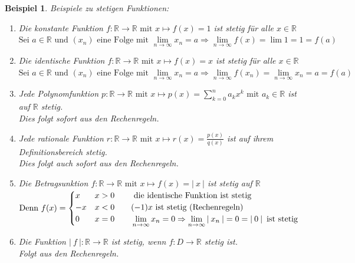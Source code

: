 \documentclass[a4paper,titlepage,oneside]{article}
\def\R{\ensuremath{\mathbb{R}} }
\renewcommand{\liminf}[2][n]{\ensuremath{\lim\limits_{#1 \rightarrow \infty}{#2}}}
\newcommand{\abs}[1]{\ensuremath{\left|\:#1\:\right|}}
\theoremstyle{thmstyle}
\newtheorem{bsp}[satz]{Beispiel}
\theoremstyle{subthmstyle}
\begin{document}
\begin{bsp}
Beispiele zu stetigen Funktionen:
\begin{enumerate}
\item Die konstante Funktion $ f : \R \to \R \text{ mit } x \mapsto f(x) = 1 $ ist stetig für alle $x \in \R$\\
$\displaystyle\text{Sei } a \in \R \text{ und } (x_n) \text{ eine Folge mit } \liminf{x_n} = a \Rightarrow \liminf{f(x)} = \lim 1 = 1 = f(a)$

\item Die identische Funktion $f : \R \to \R \text{ mit } x \mapsto f(x) = x $  ist stetig für alle $x \in \R$\\
$\displaystyle\text{Sei } a \in \R \text { und } (x_n) \text{ eine Folge mit } \liminf{x_n} = a \Rightarrow \liminf{f(x_n)} = \liminf{x_n} = a = f(a)$

\item Jede Polynomfunktion $\displaystyle p : \R \to \R \text{ mit } x \mapsto p(x) = \sum_{k=0}^{n}{a_kx^k} \text{ mit } a_k \in \R $ ist auf \R stetig. \\
Dies folgt sofort aus den Rechenregeln.

\item Jede rationale Funktion  $\displaystyle r : \R \to \R \text{ mit } x \mapsto r(x) = \frac{p(x)}{q(x)} $ ist auf ihrem Definitionsbereich stetig. \\
Dies folgt auch sofort aus den Rechenregeln.

\item Die Betragsunktion $f : \R \to \R \text{ mit } x \mapsto f(x) = \abs{x} $  ist stetig auf \R\\
$\displaystyle\vphantom{\frac{1}{n}}\text{Denn } f(x) = \begin{cases}
x & x > 0 \qquad \text{ die identische Funktion ist stetig} \\
-x & x < 0 \qquad (-1)x \text{ ist stetig (Rechenregeln)} \\
0 & x = 0 \qquad \liminf{x_n} = 0 \Rightarrow \liminf{\abs{x_n}} = 0 = \abs{0} \text{ ist stetig}
\end{cases}$

\item Die Funktion $\abs{f} : \R \to \R $  ist stetig, wenn $ f: D \to \R $ stetig ist. \\
Folgt aus den Rechenregeln.


\end{enumerate}
\end{bsp}
\end{document}
